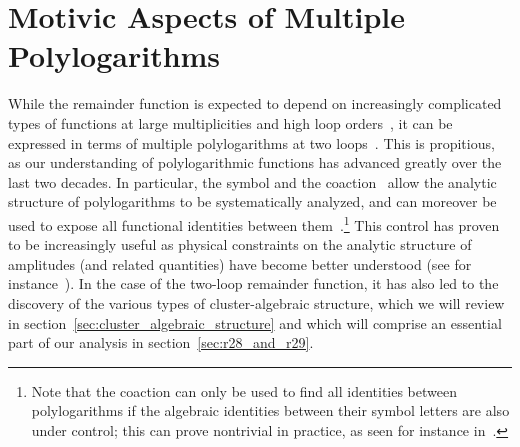 \documentclass[11pt]{article}
\begin{document}
\section{Motivic Aspects of Multiple Polylogarithms}
\label{sec:motivic_aspects_polylogs}

While the remainder function is expected to depend on increasingly complicated types of functions at large multiplicities and high loop orders~\cite{Paulos:2012nu,CaronHuot:2012ab,Nandan:2013ip,Chicherin:2017bxc,Bourjaily:2017bsb,Bourjaily:2018ycu,Bourjaily:2019hmc}, it can be expressed in terms of multiple polylogarithms at two loops~\cite{CaronHuot:2011ky}. This is propitious, as our understanding of polylogarithmic functions has advanced greatly over the last two decades. In particular, the symbol and the coaction~\cite{Goncharov:2001iea,Brown:2009qja,Goncharov:2010jf,Brown1102.1312,Brown:2015fyf} allow the analytic structure of polylogarithms to be systematically analyzed, and can moreover be used to expose all functional identities between them~\cite{Goncharov:2005sla,2011arXiv1101.4497D,Brown:2011ik,Duhr:2011zq,Duhr:2012fh}.\footnote{Note that the coaction can only be used to find all identities between polylogarithms if the algebraic identities between their symbol letters are also under control; this can prove nontrivial in practice, as seen for instance in~\cite{Bourjaily:2019igt}.} This control has proven to be increasingly useful as physical constraints on the analytic structure of amplitudes (and related quantities) have become better understood (see for instance~\cite{Bloch:2010gk,Abreu:2014cla,Bloch:2015efx,Abreu:2017ptx,Caron-Huot:2019bsq,Bourjaily:2019exo,Bourjaily:2020wvq,Benincasa:2020aoj,Dixon:2020bbt}). In the case of the two-loop remainder function, it has also led to the discovery of the various types of cluster-algebraic structure, which we will review in section~\ref{sec:cluster_algebraic_structure} and which will comprise an essential part of our analysis in section~\ref{sec:r28_and_r29}. %
\end{document}
